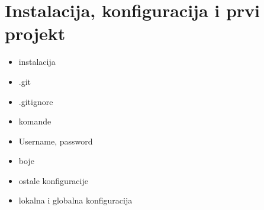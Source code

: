 \chapter*{Instalacija, konfiguracija i prvi projekt}

\begin{itemize}
   \item instalacija
   \item .git
   \item .gitignore
   \item komande
   \item Username, password
   \item boje
   \item ostale konfiguracije
   \item lokalna i globalna konfiguracija
\end{itemize}


